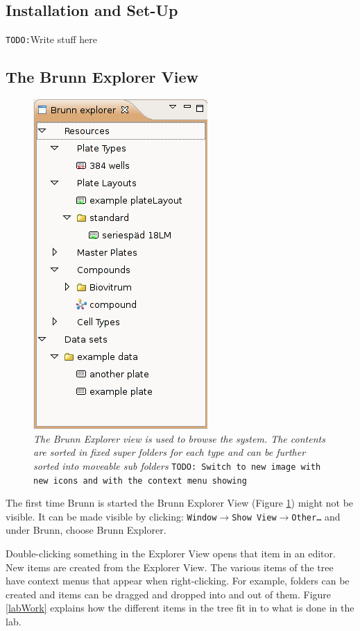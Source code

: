 \documentclass[a4paper,10pt]{article}
\begin{document}
         \subsection{Installation and Set-Up}
         \texttt{TODO:}Write stuff here

         \subsection{The Brunn Explorer View} 
            \begin{figure}
                \begin{center}
                    \includegraphics[width=.2\textwidth]
                                    {images/explorerView.png}
                \end{center}
                \caption{\textit{The Brunn Explorer view is used to browse the
                    system. The contents are sorted in fixed super folders for
                    each type and can be further sorted into moveable sub
                    folders } \texttt{TODO: Switch to new image with new icons
                    and with the context menu showing}}
                \label{explorerView}
            \end{figure}

            \noindent
            The first time Brunn is started the Brunn Explorer View (Figure
            \ref{explorerView}) might not be visible. It can be made visible by
            clicking: \texttt{Window$\rightarrow$Show
            View$\rightarrow$Other\ldots} and under Brunn, choose Brunn
            Explorer. 

            Double-clicking something in the Explorer View opens that item in
            an editor. New items are created from the Explorer View. The
            various items of the tree have context menus that appear when
            right-clicking. For example, folders can be created and items can be
            dragged and dropped into and out of them. Figure \ref{labWork}
            explains how the different items in the tree fit in to what is done
            in the lab.  
\end{document}
